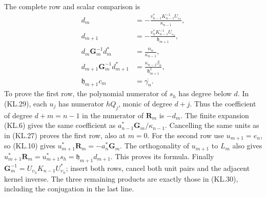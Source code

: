 The complete row and scalar comparison is
\[
\boxed{\begin{aligned}
 d_m&=-\frac{v_{n-1}^*K_{n-1}^{-1}U_{\varepsilon_h}}
                    {\kappa_{n-1}},\\
 d_{m+1}&=-\frac{v_n^*K_{n-1}^{-1}U_{\varepsilon_h}}
                         {\mathfrak h_{m+1}},\\
 d_m\mathbf G_m^{-1}d_m^*
      &=\frac{\alpha_n}{\kappa_{n-1}},\\
 d_{m+1}\mathbf G_m^{-1}d_{m+1}^*
      &=\frac{\kappa_{n-1}\beta_n}{\mathfrak h_{m+1}^2},\\
 \mathfrak h_{m+1}c_m&=\overline{\gamma_n}.
\end{aligned}}                                                 \tag{KL.30}
\]
To prove the first row, the polynomial numerator of \(s_h\)
has degree below \(d\).  In (KL.29), each \(u_j\) has numerator
\(hQ_j\), monic of degree \(d+j\).  Thus the coefficient of
degree \(d+m=n-1\) in the numerator of \(\mathbf R_m\) is
\(-d_m\).  The finite expansion (KL.6) gives the same coefficient
as \(a_{n-1}^*\mathbf G_m/\kappa_{n-1}\).  Cancelling the
same units as in (KL.27) proves the first row, also at \(m=0\).
For the second row use \(u_{m+1}=e_n\), so (KL.10) gives
\(u_{m+1}^*\mathbf R_m=-a_n^*\mathbf G_m\).
The orthogonality of \(u_{m+1}\) to \(L_m\) also gives
\(u_{m+1}^*\mathbf R_m=u_{m+1}^*s_h
 =\mathfrak h_{m+1}d_{m+1}\).  This proves its formula.
Finally
\(\mathbf G_m^{-1}=U_{\upsilon_h}K_{n-1}U_{\upsilon_h}^*\);
insert both rows, cancel both unit pairs and the adjacent kernel
inverse.  The three remaining products are exactly those in
(KL.30), including the conjugation in the last line.

